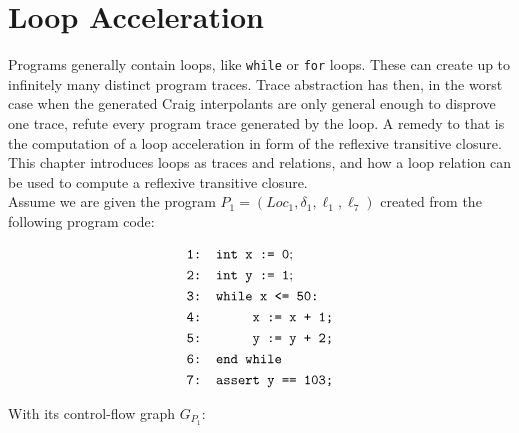 \documentclass{article}
\begin{document}
\section{Loop Acceleration}\label{sec:loopaccel}
Programs generally contain loops, like \texttt{while} or \texttt{for} loops. These can create up to infinitely many distinct program traces. Trace abstraction has then, in the worst case when the generated Craig interpolants are only general enough to disprove one trace, refute every program trace generated by the loop. A remedy to that is the computation of a loop acceleration in form of the reflexive transitive closure. This chapter introduces loops as traces and relations, and how a loop relation can be used to compute a reflexive transitive closure. \\

Assume we are given the program $P_1 = (Loc_1, \delta_1, \ell_{1}, \ell_{7})$ created from the following program code: \\
\begin{figure}[H]
    \begin{align*}
        &\texttt{1: int x := 0}; \\
        &\texttt{2: int y := 1}; \\
        &\texttt{3: while x <= 50:} \\
        &\texttt{4: \hspace*{2em} x := x + 1;} \\
        &\texttt{5: \hspace*{2em} y := y + 2;} \\
        &\texttt{6: end while} \\
        &\texttt{7: assert y == 103;}
    \end{align*}
    \label{fig:ex:p1}
\end{figure}
With its control-flow graph $G_{P_1}$: \\
\end{document}
